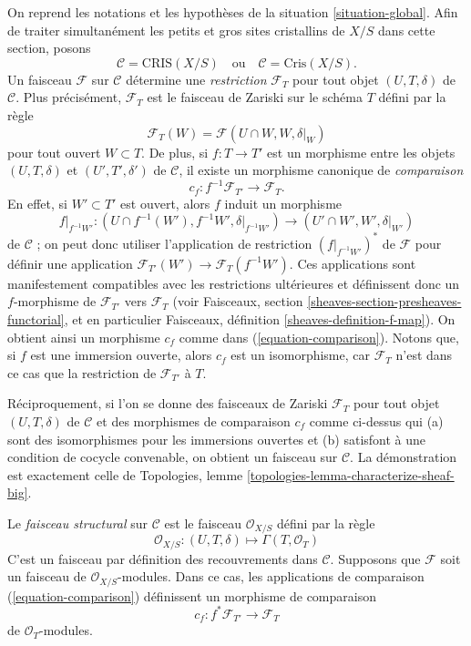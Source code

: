 \noindent
On reprend les notations et les hypothèses de la situation \ref{situation-global}.
Afin de traiter simultanément les petits et gros sites cristallins de $X/S$
dans cette section, posons
$$
\mathcal{C} = \text{CRIS}(X/S)
\quad\text{ou}\quad
\mathcal{C} = \text{Cris}(X/S).
$$
Un faisceau $\mathcal{F}$ sur $\mathcal{C}$ détermine une
{\it restriction} $\mathcal{F}_T$ pour tout objet $(U, T, \delta)$
de $\mathcal{C}$. Plus précisément, $\mathcal{F}_T$ est le faisceau de Zariski sur
le schéma $T$ défini par la règle
$$
\mathcal{F}_T(W) = \mathcal{F}(U \cap W, W, \delta|_W)
$$
pour tout ouvert $W \subset T$. De plus, si $f : T \to T'$ est un morphisme
entre les objets
$(U, T, \delta)$ et $(U', T', \delta')$ de $\mathcal{C}$, il existe
un morphisme canonique de {\it comparaison}
\begin{equation}
\label{equation-comparison}
c_f : f^{-1}\mathcal{F}_{T'} \longrightarrow \mathcal{F}_T.
\end{equation}
En effet, si $W' \subset T'$ est ouvert, alors $f$ induit un morphisme
$$
f|_{f^{-1}W'} :
(U \cap f^{-1}(W'), f^{-1}W', \delta|_{f^{-1}W'})
\longrightarrow
(U' \cap W', W', \delta|_{W'})
$$
de $\mathcal{C}$ ; on peut donc utiliser l'application de restriction
$(f|_{f^{-1}W'})^*$ de $\mathcal{F}$ pour définir une application
$\mathcal{F}_{T'}(W') \to \mathcal{F}_T(f^{-1}W')$.
Ces applications sont manifestement compatibles avec les restrictions ultérieures et
définissent donc un $f$-morphisme de $\mathcal{F}_{T'}$ vers $\mathcal{F}_T$ (voir
Faisceaux, section \ref{sheaves-section-presheaves-functorial},
et en particulier
Faisceaux, définition \ref{sheaves-definition-f-map}).
On obtient ainsi un morphisme $c_f$ comme dans (\ref{equation-comparison}).
Notons que, si $f$ est une immersion ouverte, alors $c_f$ est un
isomorphisme, car $\mathcal{F}_T$ n'est dans ce cas que
la restriction de $\mathcal{F}_{T'}$ à $T$.

\medskip\noindent
Réciproquement, si l'on se donne des faisceaux de Zariski $\mathcal{F}_T$ pour tout objet
$(U, T, \delta)$ de $\mathcal{C}$ et des morphismes de comparaison
$c_f$ comme ci-dessus qui (a) sont des isomorphismes pour les immersions ouvertes et (b)
satisfont à une condition de cocycle convenable, on obtient un faisceau sur
$\mathcal{C}$. La démonstration est exactement celle de
Topologies, lemme \ref{topologies-lemma-characterize-sheaf-big}.

\medskip\noindent
Le {\it faisceau structural} sur $\mathcal{C}$ est le faisceau
$\mathcal{O}_{X/S}$ défini par la règle
$$
\mathcal{O}_{X/S} :
(U, T, \delta)
\longmapsto
\Gamma(T, \mathcal{O}_T)
$$
C'est un faisceau par définition des recouvrements dans $\mathcal{C}$.
Supposons que $\mathcal{F}$ soit un faisceau de $\mathcal{O}_{X/S}$-modules.
Dans ce cas, les applications de comparaison (\ref{equation-comparison})
définissent un morphisme de comparaison
\begin{equation}
\label{equation-comparison-modules}
c_f : f^*\mathcal{F}_{T'} \longrightarrow \mathcal{F}_T
\end{equation}
de $\mathcal{O}_T$-modules.

